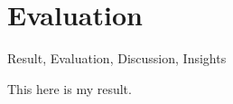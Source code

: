 \chapter{Evaluation}
\label{chapter:Eva}
Result, Evaluation, Discussion, Insights


This here is my result.

